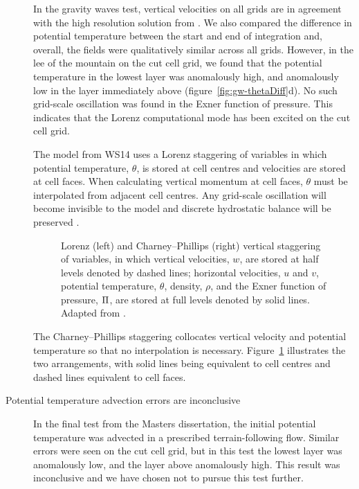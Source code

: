 \documentclass[a4paper]{article}
\begin{document}
\begin{description}
{In the gravity waves test, vertical velocities on all grids are in agreement with the high resolution solution from \citet{melvin2010}.  We also compared the difference in potential temperature between the start and end of integration and, overall, the fields were qualitatively similar across all grids.  However, in the lee of the mountain on the cut cell grid, we found that the potential temperature in the lowest layer was anomalously high, and anomalously low in the layer immediately above (figure~\ref{fig:gw-thetaDiff}d).  No such grid-scale oscillation was found in the Exner function of pressure.  This indicates that the Lorenz computational mode has been excited on the cut cell grid.

The model from WS14 uses a Lorenz staggering of variables in which potential temperature, $\theta$, is stored at cell centres and velocities are stored at cell faces.  When calculating vertical momentum at cell faces, $\theta$ must be interpolated from adjacent cell centres.  Any grid-scale oscillation will become invisible to the model and discrete hydrostatic balance will be preserved \citep{arakawa-konor1996}.

\begin{figure}
	\centering
	
%
	\caption{Lorenz (left) and Charney--Phillips (right) vertical staggering of variables, in which vertical velocities, $w$, are stored at half levels denoted by dashed lines; horizontal velocities, $u$ and $v$, potential temperature, $\theta$, density, $\rho$, and the Exner function of pressure, $\Pi$, are stored at full levels denoted by solid lines.  Adapted from \cite{holdaway2013a}.}
	\label{fig:staggering}
\end{figure}

The Charney--Phillips staggering collocates vertical velocity and potential temperature so that no interpolation is necessary.
Figure~\ref{fig:staggering} illustrates the two arrangements, with solid lines being equivalent to cell centres and dashed lines equivalent to cell faces.}

	\item[Potential temperature advection errors are inconclusive]{In the final test from the Masters dissertation, the initial potential temperature was advected in a prescribed terrain-following flow.  Similar errors were seen on the cut cell grid, but in this test the lowest layer was anomalously low, and the layer above anomalously high.  This result was inconclusive and we have chosen not to pursue this test further.}
\end{description}
\end{document}

